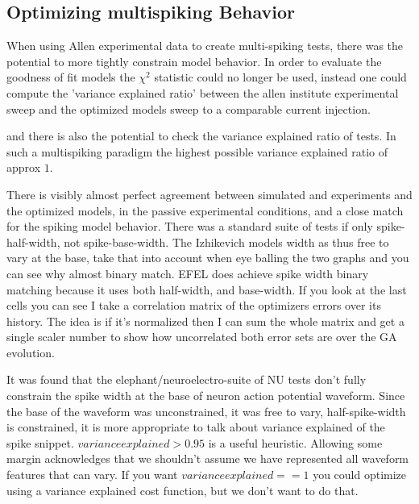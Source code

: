 \subsection{Optimizing multispiking Behavior}

When using Allen experimental data to create multi-spiking tests, there was the potential to more tightly constrain model behavior. In order to evaluate the goodness of fit models the $\chi^{2}$ statistic could no longer be used, instead one could compute the 'variance explained ratio' between the allen institute experimental sweep and the optimized models sweep to a comparable current injection.

and there is also the potential to check the variance explained ratio of tests. In such a multispiking paradigm the highest possible variance explained ratio of approx $1$. 


There is visibly almost perfect  agreement between simulated and experiments and the optimized models, in the passive experimental conditions, and a close match for the spiking model behavior. There was a standard suite of tests if only spike-half-width, not spike-base-width. The Izhikevich models width as thus free to vary at the base, take that into account when eye balling the two graphs and you can see why almost binary match. EFEL does achieve spike width binary matching because it uses both half-width, and base-width. If you look at the last cells you can see I take a correlation matrix of the optimizers errors over its history. The idea is if it's normalized then I can sum the whole matrix and get a single scaler number to show how uncorrelated both error sets are over the GA evolution. 

It was found that the elephant/neuroelectro-suite of NU tests don't fully constrain the spike width at the base of neuron action potential waveform. Since the base of the waveform was unconstrained, it was free to vary, half-spike-width is constrained, it is more appropriate to talk about variance explained of the spike snippet. $variance explained>0.95$ is a useful heuristic. Allowing some margin acknowledges that we shouldn't assume we have represented all waveform features that can vary. If you want $variance explained==1$   
you could optimize using a variance explained 
cost function, but we don't want to do that.